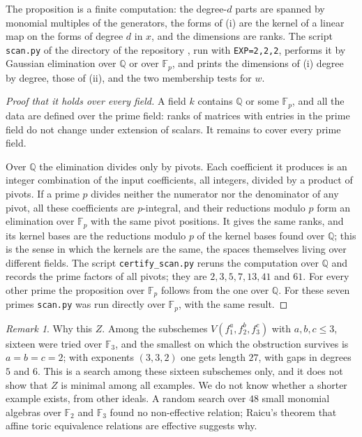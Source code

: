 \documentclass[11pt,a4paper]{amsart}
\theoremstyle{remark}
\newtheorem{remark}[theorem]{Remark}
\newcommand{\F}{\mathbb F}
\newcommand{\Q}{\mathbb Q}
\begin{document}
The proposition is a finite computation: the degree-$d$ parts are spanned by monomial multiples of the generators, the forms of (i) are the kernel of a linear map on the forms of degree $d$ in $x$, and the dimensions are ranks. The script \texttt{scan.py} of the directory  of the repository \cite{repo}, run with \texttt{EXP=2,2,2}, performs it by Gaussian elimination over $\Q$ or over $\F_p$, and prints the dimensions of (i) degree by degree, those of (ii), and the two membership tests for $w$.

\begin{proof}[Proof that it holds over every field]
A field $k$ contains $\Q$ or some $\F_p$, and all the data are defined over the prime field: ranks of matrices with entries in the prime field do not change under extension of scalars. It remains to cover every prime field.

Over $\Q$ the elimination divides only by pivots. Each coefficient it produces is an integer combination of the input coefficients, all integers, divided by a product of pivots. If a prime $p$ divides neither the numerator nor the denominator of any pivot, all these coefficients are $p$-integral, and their reductions modulo $p$ form an elimination over $\F_p$ with the same pivot positions. It gives the same ranks, and its kernel bases are the reductions modulo $p$ of the kernel bases found over $\Q$; this is the sense in which the kernels are the same, the spaces themselves living over different fields. The script \texttt{certify\_scan.py} reruns the computation over $\Q$ and records the prime factors of all pivots; they are $2, 3, 5, 7, 13, 41$ and $61$. For every other prime the proposition over $\F_p$ follows from the one over $\Q$. For these seven primes \texttt{scan.py} was run directly over $\F_p$, with the same result.
\end{proof}

\begin{remark}
Why this $Z$. Among the subschemes $V(f_1^a, f_2^b, f_3^c)$ with $a, b, c \le 3$, sixteen were tried over $\F_3$, and the smallest on which the obstruction survives is $a = b = c = 2$; with exponents $(3, 3, 2)$ one gets length $27$, with gaps in degrees $5$ and $6$. This is a search among these sixteen subschemes only, and it does not show that $Z$ is minimal among all examples. We do not know whether a shorter example exists, from other ideals. A random search over $48$ small monomial algebras over $\F_2$ and $\F_3$ found no non-effective relation; Raicu's theorem that affine toric equivalence relations are effective \cite{raicu2010} suggests why.
\end{remark}
\end{document}
